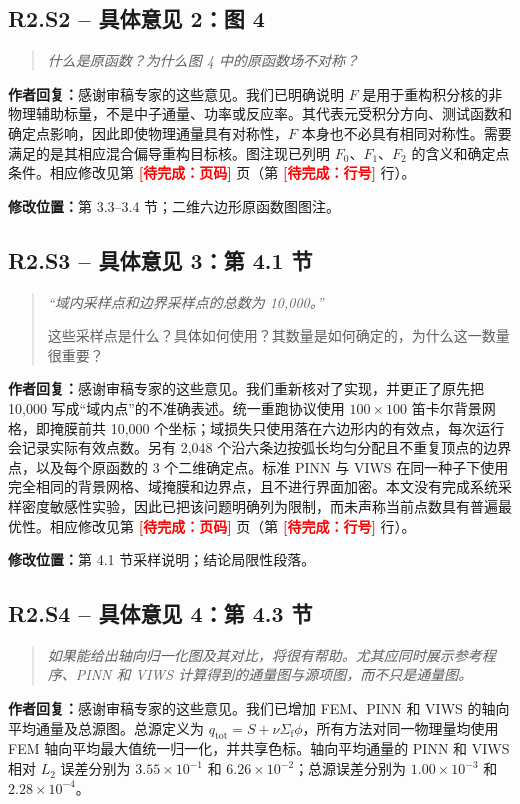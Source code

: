 \documentclass[11pt,a4paper]{article}
\newenvironment{reviewercomment}{\begin{quote}\small\itshape\color{commentgray}}{\end{quote}}
\newcommand{\authorresponse}{\noindent\textbf{作者回复：}\quad}
\newcommand{\revisionlocation}[1]{\par\noindent\textcolor{locationblue}{\textbf{修改位置：}}#1}
\newcommand{\draftplaceholder}[1]{\textcolor{red}{\textbf{[待完成：#1]}}}
\begin{document}
\subsection*{R2.S2 -- 具体意见 2：图 4}
\begin{reviewercomment}
什么是原函数？为什么图 4 中的原函数场不对称？
\end{reviewercomment}
\authorresponse 感谢审稿专家的这些意见。我们已明确说明 $F$ 是用于重构积分核的非物理辅助标量，不是中子通量、功率或反应率。其代表元受积分方向、测试函数和确定点影响，因此即使物理通量具有对称性，$F$ 本身也不必具有相同对称性。需要满足的是其相应混合偏导重构目标核。图注现已列明 $F_0$、$F_1$、$F_2$ 的含义和确定点条件。相应修改见第 \draftplaceholder{页码} 页（第 \draftplaceholder{行号} 行）。
\revisionlocation{第 3.3--3.4 节；二维六边形原函数图图注。}

\subsection*{R2.S3 -- 具体意见 3：第 4.1 节}
\begin{reviewercomment}
“域内采样点和边界采样点的总数为 10,000。”

这些采样点是什么？具体如何使用？其数量是如何确定的，为什么这一数量很重要？
\end{reviewercomment}
\authorresponse 感谢审稿专家的这些意见。我们重新核对了实现，并更正了原先把 10,000 写成“域内点”的不准确表述。统一重跑协议使用 $100\times100$ 笛卡尔背景网格，即掩膜前共 10,000 个坐标；域损失只使用落在六边形内的有效点，每次运行会记录实际有效点数。另有 2,048 个沿六条边按弧长均匀分配且不重复顶点的边界点，以及每个原函数的 3 个二维确定点。标准 PINN 与 VIWS 在同一种子下使用完全相同的背景网格、域掩膜和边界点，且不进行界面加密。本文没有完成系统采样密度敏感性实验，因此已把该问题明确列为限制，而未声称当前点数具有普遍最优性。相应修改见第 \draftplaceholder{页码} 页（第 \draftplaceholder{行号} 行）。
\revisionlocation{第 4.1 节采样说明；结论局限性段落。}

\subsection*{R2.S4 -- 具体意见 4：第 4.3 节}
\begin{reviewercomment}
如果能给出轴向归一化图及其对比，将很有帮助。尤其应同时展示参考程序、PINN 和 VIWS 计算得到的通量图与源项图，而不只是通量图。
\end{reviewercomment}
\authorresponse 感谢审稿专家的这些意见。我们已增加 FEM、PINN 和 VIWS 的轴向平均通量及总源图。总源定义为 $q_{\mathrm{tot}}=S+\nu\Sigma_{\mathrm f}\phi$，所有方法对同一物理量均使用 FEM 轴向平均最大值统一归一化，并共享色标。轴向平均通量的 PINN 和 VIWS 相对 $L_2$ 误差分别为 $3.55\times10^{-1}$ 和 $6.26\times10^{-2}$；总源误差分别为 $1.00\times10^{-3}$ 和 $2.28\times10^{-4}$。
\end{document}
